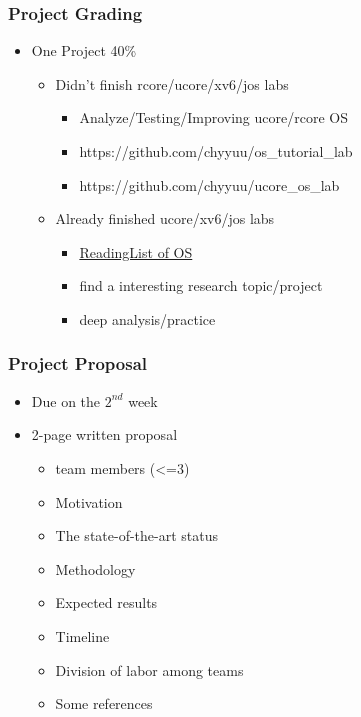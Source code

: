 \begin{frame}[plain]	
	\frametitle{Project Grading}
	
	\begin{itemize}\Large
		\item One Project		40\%
		\begin{itemize}\large
			\item Didn't finish rcore/ucore/xv6/jos labs
			\begin{itemize}\large
				\item Analyze/Testing/Improving ucore/rcore OS
				\item https://github.com/chyyuu/os\_tutorial\_lab
				\item https://github.com/chyyuu/ucore\_os\_lab
				
			\end{itemize}\pause
			\item Already finished ucore/xv6/jos labs
			\begin{itemize}\large
				\item \href{https://github.com/chyyuu/aos_course/blob/master/readinglist.md}{ReadingList of OS}
				\item find a interesting research topic/project
				\item deep analysis/practice
			\end{itemize}
		\end{itemize}
	\end{itemize}
	
	
\end{frame}

\begin{frame}[plain]	
	\frametitle{Project Proposal}
	
	\begin{itemize}\Large
		\item Due on the $ 2^{nd} $ week
		\item 2-page written proposal
		\begin{itemize}\large
			\item team members (<=3)
			\item Motivation
			\item The state-of-the-art status
			\item Methodology
			\item Expected results
			\item Timeline
			\item Division of labor among teams
			\item Some references
			
		\end{itemize}
	\end{itemize}
	
	
\end{frame}

